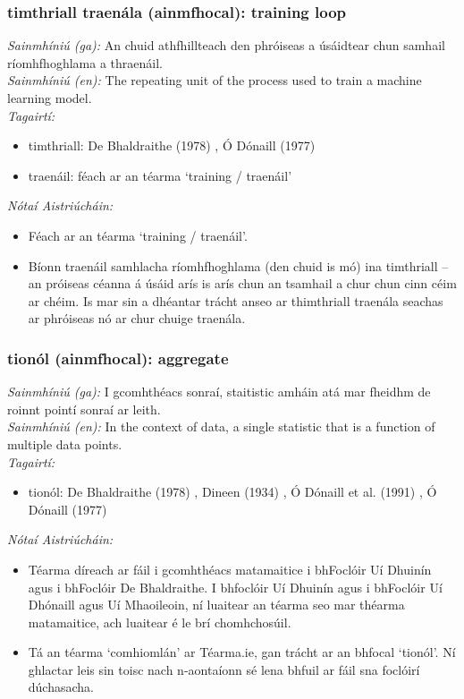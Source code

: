 \subsubsection*{timthriall traenála (ainmfhocal): training loop}
 \noindent \textit{Sainmhíniú (ga):} An chuid athfhillteach den phróiseas a úsáidtear chun samhail ríomhfhoghlama a thraenáil.
\\
 \noindent \textit{Sainmhíniú (en):} The repeating unit of the process used to train a machine learning model.
\\
 \noindent \textit{Tagairtí:}
\begin{itemize}
	\item timthriall: De Bhaldraithe (1978) \cite{de-bhaldraithe}, Ó Dónaill (1977) \cite{odonaill}
	\item traenáil: féach ar an téarma `training / traenáil'
\end{itemize}

 \noindent \textit{Nótaí Aistriúcháin:}
\begin{itemize}
	\item Féach ar an téarma `training / traenáil'.
	\item Bíonn traenáil samhlacha ríomhfhoghlama (den chuid is mó) ina timthriall -- an próiseas céanna á úsáid arís is arís chun an tsamhail a chur chun cinn céim ar chéim. Is mar sin a dhéantar trácht anseo ar thimthriall traenála seachas ar phróiseas nó ar chur chuige traenála.
\end{itemize}


\subsubsection*{tionól (ainmfhocal): aggregate}
 \noindent \textit{Sainmhíniú (ga):} I gcomhthéacs sonraí, staitistic amháin atá mar fheidhm de roinnt pointí sonraí ar leith.
\\
 \noindent \textit{Sainmhíniú (en):} In the context of data, a single statistic that is a function of multiple data points.
\\
 \noindent \textit{Tagairtí:}
\begin{itemize}
	\item tionól: De Bhaldraithe (1978) \cite{de-bhaldraithe}, Dineen (1934) \cite{dineen}, Ó Dónaill et al. (1991) \cite{focloir-beag}, Ó Dónaill (1977) \cite{odonaill}
\end{itemize}

 \noindent \textit{Nótaí Aistriúcháin:}
\begin{itemize}
	\item Téarma díreach ar fáil i gcomhthéacs matamaitice i bhFoclóir Uí Dhuinín agus i bhFoclóir De Bhaldraithe. I bhfoclóir Uí Dhuinín agus i bhFoclóir Uí Dhónaill agus Uí Mhaoileoin, ní luaitear an téarma seo mar théarma matamaitice, ach luaitear é le brí chomhchosúil.
	\item Tá an téarma `comhiomlán' ar Téarma.ie, gan trácht ar an bhfocal `tionól'. Ní ghlactar leis sin toisc nach n-aontaíonn sé lena bhfuil ar fáil sna foclóirí dúchasacha. 
\end{itemize}


